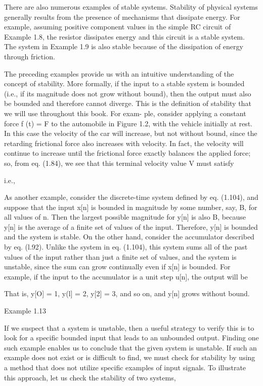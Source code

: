 \documentclass{report}
\begin{document}
There are also numerous examples of stable systems. Stability of physical systems generally results from the presence of mechanisms that dissipate
energy. For example, assuming positive component values in the simple RC circuit of Example 1.8, the resistor dissipates energy and this circuit
is a stable system. The system in Example 1.9 is also stable because of the dissipation of energy through friction.

The preceding examples provide us with an intuitive understanding of the concept of stability. More formally, if the input to a stable system is
bounded (i.e., if its magnitude does not grow without bound), then the output must also be bounded and therefore cannot diverge. This is the definition
of stability that we will use throughout this book. For exam- ple, consider applying a constant force f (t) = F to the automobile in Figure 1.2,
with the vehicle initially at rest. In this case the velocity of the car will increase, but not without bound, since the retarding frictional force
also increases with velocity. In fact, the velocity will continue to increase until the frictional force exactly balances the applied force; so,
from eq. (1.84), we see that this terminal velocity value V must satisfy



i.e.,



As another example, consider the discrete-time system defined by eq. (1.104), and suppose that the input x[n] is bounded in magnitude by some number,
say, B, for all values of n. Then the largest possible magnitude for y[n] is also B, because y[n] is the average of a finite set of values of the
input. Therefore, y[n] is bounded and the system is stable. On the other hand, consider the accumulator described by eq. (l.92). Unlike the system
in eq. (1.104), this system sums all of the past values of the input rather than just a finite set of values, and the system is unstable, since the
sum can grow continually even if x[n] is bounded. For example, if the input to the accumulator is a unit step u[n], the output will be



That is, y[O] = 1, y(l] = 2, y[2] = 3, and so on, and y[n] grows without bound.

Example 1.13

If we suspect that a system is unstable, then a useful strategy to verify this is to look for a specific bounded input that leads to an unbounded
output. Finding one such example enables us to conclude that the given system is unstable. If such an example does not exist or is difficult to find,
we must check for stability by using a method that does not utilize specific examples of input signals. To illustrate this approach, let us check
the stability of two systems,
\end{document}
